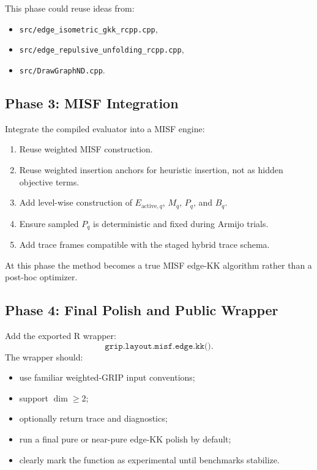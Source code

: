 \documentclass[11pt]{article}
\newcommand{\Rfunc}[1]{\texttt{#1}}
\begin{document}
This phase could reuse ideas from:
\begin{itemize}[leftmargin=2em]
  \item \texttt{src/edge\_isometric\_gkk\_rcpp.cpp},
  \item \texttt{src/edge\_repulsive\_unfolding\_rcpp.cpp},
  \item \texttt{src/DrawGraphND.cpp}.
\end{itemize}

\subsection{Phase 3: MISF Integration}

Integrate the compiled evaluator into a MISF engine:
\begin{enumerate}[leftmargin=2em]
  \item Reuse weighted MISF construction.
  \item Reuse weighted insertion anchors for heuristic insertion, not as hidden
  objective terms.
  \item Add level-wise construction of \(E_{\mathrm{active},q}\), \(M_q\),
  \(P_q\), and \(B_q\).
  \item Ensure sampled \(P_q\) is deterministic and fixed during Armijo trials.
  \item Add trace frames compatible with the staged hybrid trace schema.
\end{enumerate}

At this phase the method becomes a true MISF edge-KK algorithm rather than a
post-hoc optimizer.

\subsection{Phase 4: Final Polish and Public Wrapper}

Add the exported R wrapper:
\[
  \Rfunc{grip.layout.misf.edge.kk()}.
\]
The wrapper should:
\begin{itemize}[leftmargin=2em]
  \item use familiar weighted-GRIP input conventions;
  \item support \(\dim\ge 2\);
  \item optionally return trace and diagnostics;
  \item run a final pure or near-pure edge-KK polish by default;
  \item clearly mark the function as experimental until benchmarks stabilize.
\end{itemize}
\end{document}
